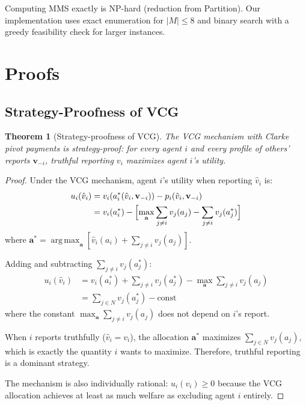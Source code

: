 \documentclass[10pt]{article}
\newtheorem{theorem}{Theorem}
\DeclareMathOperator*{\argmax}{arg\,max}
\begin{document}
Computing MMS exactly is NP-hard (reduction from Partition). Our implementation uses exact enumeration for $|M| \leq 8$ and binary search with a greedy feasibility check for larger instances.

\section{Proofs}
\label{app:proofs}

\subsection{Strategy-Proofness of VCG}
\label{app:proof-vcg}

\begin{theorem}[Strategy-proofness of VCG]
The VCG mechanism with Clarke pivot payments is strategy-proof: for every agent $i$ and every profile of others' reports $\mathbf{v}_{-i}$, truthful reporting $v_i$ maximizes agent $i$'s utility.
\end{theorem}

\begin{proof}
Under the VCG mechanism, agent $i$'s utility when reporting $\hat{v}_i$ is:
\begin{align}
u_i(\hat{v}_i) &= v_i(a_i^*(\hat{v}_i, \mathbf{v}_{-i})) - p_i(\hat{v}_i, \mathbf{v}_{-i}) \\
&= v_i(a_i^*) - \Bigl[\max_\mathbf{a} \sum_{j \neq i} v_j(a_j) - \sum_{j \neq i} v_j(a_j^*)\Bigr]
\end{align}
where $\mathbf{a}^* = \argmax_\mathbf{a} [\hat{v}_i(a_i) + \sum_{j \neq i} v_j(a_j)]$.

Adding and subtracting $\sum_{j \neq i} v_j(a_j^*)$:
\begin{align}
u_i(\hat{v}_i) &= v_i(a_i^*) + \sum_{j \neq i} v_j(a_j^*) - \max_\mathbf{a} \sum_{j \neq i} v_j(a_j) \\
&= \sum_{j \in N} v_j(a_j^*) - \text{const}
\end{align}
where the constant $\max_\mathbf{a} \sum_{j \neq i} v_j(a_j)$ does not depend on $i$'s report.

When $i$ reports truthfully ($\hat{v}_i = v_i$), the allocation $\mathbf{a}^*$ maximizes $\sum_{j \in N} v_j(a_j)$, which is exactly the quantity $i$ wants to maximize. Therefore, truthful reporting is a dominant strategy.

The mechanism is also individually rational: $u_i(v_i) \geq 0$ because the VCG allocation achieves at least as much welfare as excluding agent $i$ entirely.
\end{proof}
\end{document}
